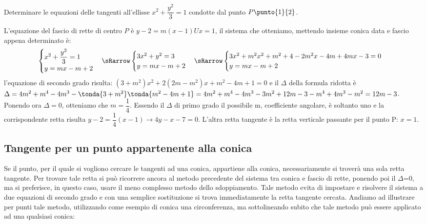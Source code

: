 \begin{esempio} Determinare le equazioni delle tangenti 
all'ellisse \(x^{2} + \dfrac{y^{2}}{3} =1\) condotte dal punto 
\(P\punto{1}{2}\).

L'equazione del fascio di rette di centro \(P\) è \(y-2=m(x-1) U x=1\), il 
sistema che otteniamo, mettendo insieme conica data e fascio appena determinato 
è:
\[\begin{cases}  x^{2}+\dfrac{y^{2}}{3}=1   \\ y=mx-m+2  
\end{cases} \sRarrow  
\begin{cases}  3x^{2}+y^{2}=3   \\ y=mx-m+2  
\end{cases} \sRarrow 
\begin{cases}  3x^{2}+m^{2}x^{2}+m^{2}+4-2m^{2}x-4m+4mx-3=0   \\ y=mx-m+2  
\end{cases}\]
l'equazione di secondo grado risulta: 
$\left(3+ m^{2} \right) x^{2} +2\left(2m-m^{2} \right)x+ m^{2} -4m+1=0$ 
e il $\Delta$ della formula 
ridotta è 
$\Delta =4 m^{2} + m^{4} -4 m^{3} -\tonda{3+ m^{2}}\tonda{m^{2}-4m+1}=
4 m^{2} + m^{4} -4 m^{3} -3 m^{2} +12m-3- m^{4} +4 m^{3} - m^{2} =12m-3$. 
Ponendo ora $\Delta =0$, otteniamo che $m=\dfrac{1}{4}$. 
Essendo il $\Delta$ di primo grado il possibile m, coefficiente angolare, 
è soltanto uno e la corrispondente retta risulta 
$y-2=\dfrac{1}{4}(x-1) \longrightarrow  4y-x-7=0$. 
L'altra retta tangente è la retta verticale passante per il punto P: \(x=1\).
\end{esempio}

\subsection{Tangente per un punto appartenente alla conica}

Se il punto, per il quale si vogliono cercare le tangenti ad una conica, 
appartiene alla conica, necessariamente si troverà una sola retta tangente. 
Per trovare tale retta si può ricorrere ancora al metodo precedente del 
sistema tra conica e fascio di rette, ponendo poi il $ \Delta $=0, ma si 
preferisce, in questo caso, usare il meno complesso metodo dello 
sdoppiamento. Tale metodo evita di impostare e risolvere il sistema a due 
equazioni di secondo grado e con una semplice sostituzione si trova 
immediatamente la retta tangente cercata.
Andiamo ad illustrare per punti tale metodo, utilizzando come esempio di 
conica una circonferenza, ma sottolineando subito che tale metodo può 
essere applicato ad una qualsiasi conica:

